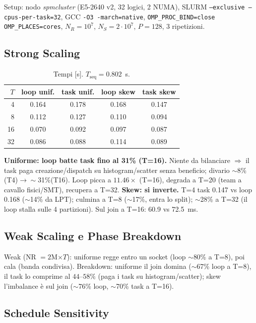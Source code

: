\documentclass[11pt,a4paper]{article}
\begin{document}
Setup: nodo \textit{spmcluster} (E5-2640 v2, 32 logici, 2 NUMA), SLURM \texttt{--exclusive --cpus-per-task=32}, GCC \texttt{-O3 -march=native}, \texttt{OMP\_PROC\_BIND=close OMP\_PLACES=cores}, $N_R=10^7$, $N_S=2{\cdot}10^7$, $P=128$, 3 ripetizioni.

\subsection{Strong Scaling}

\begin{table}[H]\centering\small
\begin{tabular}{@{}rcccc@{}}\toprule
$T$ & loop unif. & task unif. & loop skew & task skew \\\midrule
4 & 0.164 & 0.178 & 0.168 & 0.147 \\ 8 & 0.112 & 0.127 & 0.110 & 0.094 \\
16 & 0.070 & 0.092 & 0.097 & 0.087 \\ 32 & 0.086 & 0.088 & 0.114 & 0.089 \\\bottomrule
\end{tabular}\caption{Tempi [s]. $T_\text{seq}=0.802$~s.}
\end{table}

\begin{difesa}
\textbf{Uniforme: loop batte task fino al 31\% (T=16).} Niente da bilanciare $\Rightarrow$ il task paga creazione/dispatch su histogram/scatter senza beneficio; divario $\sim$8\%(T4)$\to\sim$31\%(T16). Loop picca a $11.46\times$ (T=16), degrada a T=20 (team a cavallo fisici/SMT), recupera a T=32. \textbf{Skew: si inverte.} T=4 task 0.147 vs loop 0.168 ($\sim$14\% da LPT); culmina a T=8 ($\sim$17\%, entra lo split); $\sim$28\% a T=32 (il loop stalla sulle 4 partizioni). Sul join a T=16: 60.9 vs 72.5~ms.
\end{difesa}

\subsection{Weak Scaling e Phase Breakdown}

Weak (NR $=2$M$\times T$): uniforme regge entro un socket (loop $\sim$80\% a T=8), poi cala (banda condivisa). Breakdown: uniforme il join domina ($\sim$67\% loop a T=8), il task lo comprime al $44$--$58\%$ (paga i task su histogram/scatter); skew l'imbalance è sul join ($\sim$76\% loop, $\sim$70\% task a T=16).

\subsection{Schedule Sensitivity}
\end{document}
